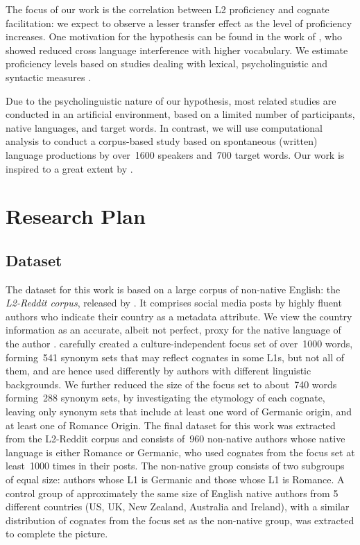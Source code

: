 \documentclass[11pt]{article}
\begin{document}
The focus of our work is the correlation between L2 proficiency and cognate facilitation: we expect to observe a lesser transfer effect as the level of proficiency increases. One motivation for the hypothesis can be found in the work of \cite{Prior-etal:2017}, who showed reduced  cross language interference with higher vocabulary.
We estimate proficiency levels based on studies dealing with lexical, psycholinguistic and syntactic measures \citep{Kuperman2012,LuAi2015,kyle2015automatically}.

Due to the psycholinguistic nature of our hypothesis, most related studies are conducted in an artificial environment, based on a limited number of participants, native languages, and target words. In contrast, we will use  computational analysis to conduct a corpus-based study based on spontaneous (written) language productions by over~1600 speakers and~700 target words. Our work is inspired to a great extent by \citet{TACL1403}.


\section{Research Plan}

\subsection{Dataset}
\label{sec:dataset}

The dataset for this work is based on a large corpus of non-native English: the \emph{L2-Reddit corpus}, released by \citet{TACL1403}. It comprises social media posts by highly fluent authors who indicate their country as a metadata attribute.  We view the country information as an accurate, albeit not perfect, proxy for the native language of the author \citep{D18-1395}.  
\citet{TACL1403} carefully created  a culture-independent focus set of over~1000 words, forming~541 synonym sets that may reflect cognates in some L1s, but not all of them, and are hence used differently by authors with different linguistic backgrounds.
We further reduced the size of the focus set to about~740 words forming~288 synonym sets, by investigating the etymology of each cognate, leaving only synonym sets that include at least one word of Germanic origin, and at least one of Romance Origin.
The final dataset for this work was extracted from the L2-Reddit corpus and consists of~960 non-native authors whose native language is either Romance or Germanic, who used cognates from the focus set at least~1000 times in their posts.
The non-native group consists of two subgroups of equal size:  authors whose L1 is Germanic and those whose L1 is Romance. 
A control group of approximately the same size of English native authors from 5 different countries (US, UK, New Zealand, Australia and Ireland), with a similar distribution of cognates from the focus set as the non-native group, was extracted to complete the picture. 
\end{document}
